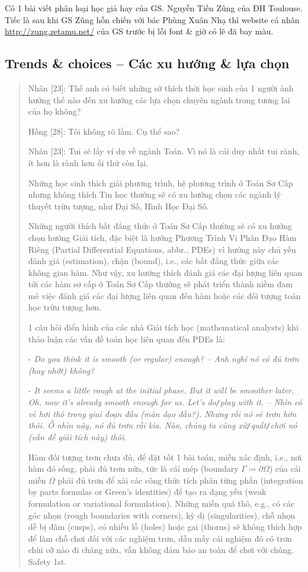 \documentclass[12pt]{article}
\begin{document}
Có 1 bài viết phân loại học giả hay của GS. Nguyễn Tiến Zũng của ĐH Toulouse. Tiếc là sau khi GS Zũng hỗn chiến với bác  Phùng Xuân Nhạ thì website cá nhân \url{http://zung.zetamu.net/} của GS trước bị lỗi font \& giờ có lẽ đã bay màu.

\subsection{Trends \& choices -- Các xu hướng \& lựa chọn}	

\begin{quotation}
	{\sf Nhân [23]}: Thế anh có biết những sở thích thời học sinh của 1 người ảnh hưởng thế nào đến xu hướng các lựa chọn chuyên ngành trong tương lai của họ không?
	
	{\sf Hồng [28]}: Tôi không rõ lắm. Cụ thể sao?
	
	{\sf Nhân [23]}: Tui sẽ lấy ví dụ về ngành Toán. Vì nó là cái duy nhất tui rành, ít hơn là rành hơn ối thứ còn lại.
	
	Những học sinh thích giải phương trình, hệ phương trình ở Toán Sơ Cấp nhưng không thích Tin học thường sẽ có xu hướng chọn các ngành lý thuyết trừu tượng, như Đại Số, Hình Học Đại Số. 
	
	Những người thích bất đẳng thức ở Toán Sơ Cấp thường sẽ có xu hướng chọn hướng Giải tích, đặc biệt là hướng Phương Trình Vi Phân Đạo Hàm Riêng (Partial Differential Equations, abbr., PDEs) vì hướng này chủ yếu đánh giá (estimation), chặn (bound), i.e., các bất đẳng thức giữa các không gian hàm. Như vậy, xu hướng thích đánh giá các đại lượng liên quan tới các hàm sơ cấp ở Toán Sơ Cấp thường sẽ phát triển thành niềm đam mê việc đánh giá các đại lượng liên quan đến hàm hoặc các đối tượng toán học trừu tượng hơn.

	1 câu hỏi điển hình của các nhà Giải tích học (mathematical analysts) khi thảo luận các vấn đề toán học liên quan đến PDEs là:
	
	- {\it Do you think it is smooth (or regular) enough? -- Anh nghĩ nó có đủ trơn (hay nhớt) không?}
	
	- {\it It seems a little rough at the initial phase. But it will be smoother later. Oh, now it's already smooth enough for us. Let's do{\tt/}play with it. -- Nhìn có vẻ hơi thô trong giai đoạn đầu (màn dạo đầu?). Nhưng rồi nó sẽ trơn hơn thôi. Ồ nhìn này, nó đủ trơn rồi kìa. Nào, chúng ta cùng xử{\tt/}quất{\tt/}chơi nó (vấn đề giải tích này) thôi}.
	
	Hàm đối tượng trơn chưa đủ, để đặt tốt 1 bài toán, miền xác định, i.e., nơi hàm đó sống, phải đủ trơn nữa, tức là cái mép (boundary $\Gamma\coloneqq\partial\Omega$) của cái miền $\Omega$ phải đủ trơn để xài các công thức tích phân từng phần (integration by parts formulas or Green's identities) để tạo ra dạng yếu (weak formulation or variational formulation). Những miền quá thô, e.g., có các góc nhọn (rough boundaries with corners), kỳ dị (singularities), chỗ nhọn dễ bị đâm (cusps), có nhiều lỗ (holes) hoặc gai (thorns) sẽ không thích hợp để làm chỗ chơi đối với các nghiệm trơn, dẫu mấy cái nghiệm đó có trơn chùi cỡ nào đi chăng nữa, vẫn không đảm bảo an toàn để chơi với chúng. Safety 1st.
	

\end{quotation}
\end{document}
